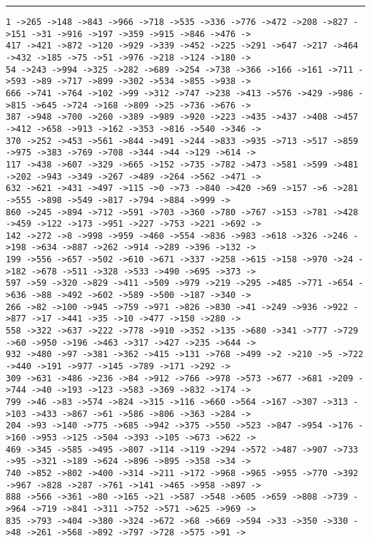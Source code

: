 \documentclass[letter, 12pt]{article}
\newenvironment{question}[1]{%
    \vspace{.2in}%
        \noindent{\bf #1}%
    \vspace{0.3em} \hrule \vspace{.1in}%
}{}
\begin{document}
\begin{question}{\large Appendix}
\begin{lstlisting}[style=CStyle]
1 ->265 ->148 ->843 ->966 ->718 ->535 ->336 ->776 ->472 ->208 ->827 ->151 ->31 ->916 ->197 ->359 ->915 ->846 ->476 ->
417 ->421 ->872 ->120 ->929 ->339 ->452 ->225 ->291 ->647 ->217 ->464 ->432 ->185 ->75 ->51 ->976 ->218 ->124 ->180 ->
54 ->243 ->994 ->325 ->282 ->689 ->254 ->738 ->366 ->166 ->161 ->711 ->593 ->89 ->717 ->899 ->302 ->534 ->855 ->938 ->
666 ->741 ->764 ->102 ->99 ->312 ->747 ->238 ->413 ->576 ->429 ->986 ->815 ->645 ->724 ->168 ->809 ->25 ->736 ->676 ->
387 ->948 ->700 ->260 ->389 ->989 ->920 ->223 ->435 ->437 ->408 ->457 ->412 ->658 ->913 ->162 ->353 ->816 ->540 ->346 ->
370 ->252 ->453 ->561 ->844 ->491 ->244 ->833 ->935 ->713 ->517 ->859 ->975 ->383 ->769 ->708 ->344 ->44 ->129 ->614 ->
117 ->438 ->607 ->329 ->665 ->152 ->735 ->782 ->473 ->581 ->599 ->481 ->202 ->943 ->349 ->267 ->489 ->264 ->562 ->471 ->
632 ->621 ->431 ->497 ->115 ->0 ->73 ->840 ->420 ->69 ->157 ->6 ->281 ->555 ->898 ->549 ->817 ->794 ->884 ->999 ->
860 ->245 ->894 ->712 ->591 ->703 ->360 ->780 ->767 ->153 ->781 ->428 ->459 ->122 ->173 ->951 ->227 ->753 ->221 ->692 ->
142 ->272 ->8 ->998 ->959 ->460 ->554 ->836 ->983 ->618 ->326 ->246 ->198 ->634 ->887 ->262 ->914 ->289 ->396 ->132 ->
199 ->556 ->657 ->502 ->610 ->671 ->337 ->258 ->615 ->158 ->970 ->24 ->182 ->678 ->511 ->328 ->533 ->490 ->695 ->373 ->
597 ->59 ->320 ->829 ->411 ->509 ->979 ->219 ->295 ->485 ->771 ->654 ->636 ->88 ->492 ->602 ->589 ->500 ->187 ->340 ->
266 ->82 ->100 ->945 ->759 ->971 ->826 ->830 ->41 ->249 ->936 ->922 ->877 ->17 ->441 ->35 ->10 ->477 ->150 ->280 ->
558 ->322 ->637 ->222 ->778 ->910 ->352 ->135 ->680 ->341 ->777 ->729 ->60 ->950 ->196 ->463 ->317 ->427 ->235 ->644 ->
932 ->480 ->97 ->381 ->362 ->415 ->131 ->768 ->499 ->2 ->210 ->5 ->722 ->440 ->191 ->977 ->145 ->789 ->171 ->292 ->
309 ->631 ->486 ->236 ->84 ->912 ->766 ->978 ->573 ->677 ->681 ->209 ->744 ->40 ->193 ->123 ->583 ->369 ->832 ->174 ->
799 ->46 ->83 ->574 ->824 ->315 ->116 ->660 ->564 ->167 ->307 ->313 ->103 ->433 ->867 ->61 ->586 ->806 ->363 ->284 ->
204 ->93 ->140 ->775 ->685 ->942 ->375 ->550 ->523 ->847 ->954 ->176 ->160 ->953 ->125 ->504 ->393 ->105 ->673 ->622 ->
469 ->345 ->585 ->495 ->807 ->114 ->119 ->294 ->572 ->487 ->907 ->733 ->95 ->321 ->189 ->624 ->896 ->895 ->358 ->34 ->
740 ->852 ->802 ->400 ->314 ->211 ->172 ->968 ->965 ->955 ->770 ->392 ->967 ->828 ->287 ->761 ->141 ->465 ->958 ->897 ->
888 ->566 ->361 ->80 ->165 ->21 ->587 ->548 ->605 ->659 ->808 ->739 ->964 ->719 ->841 ->311 ->752 ->571 ->625 ->969 ->
835 ->793 ->404 ->380 ->324 ->672 ->68 ->669 ->594 ->33 ->350 ->330 ->48 ->261 ->568 ->892 ->797 ->728 ->575 ->91 ->

\end{lstlisting}
\end{question}
\end{document}

